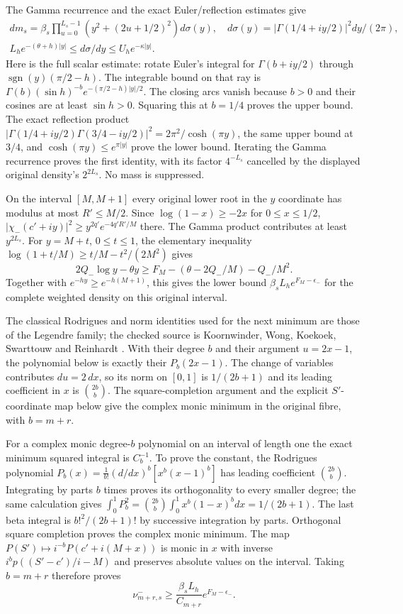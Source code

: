 \documentclass[11pt,a4paper]{article}
\begin{document}
The Gamma recurrence and the exact Euler/reflection estimates give
\[
\begin{gathered}
 dm_s=\beta_s\prod_{u=0}^{L_s-1}(y^2+(2u+1/2)^2)d\sigma(y),\quad
 d\sigma(y)=|\Gamma(1/4+iy/2)|^2dy/(2\pi),\\
 L_he^{-(\theta+h)|y|}\le d\sigma/dy\le U_he^{-\kappa|y|}.
\end{gathered}                                                     \tag{NIB11}
\]
Here is the full scalar estimate: rotate Euler's integral for
$\Gamma(b+iy/2)$ through $\operatorname{sgn}(y)(\pi/2-h)$.
The integrable bound on that ray is
$\Gamma(b)(\sin h)^{-b}e^{-(\pi/2-h)|y|/2}$.
The closing arcs vanish because $b>0$ and their cosines are at
least $\sin h>0$. Squaring this at $b=1/4$ proves the upper
bound. The exact reflection product
$|\Gamma(1/4+iy/2)\Gamma(3/4-iy/2)|^2=2\pi^2/\cosh(\pi y)$,
the same upper bound at $3/4$, and $\cosh(\pi y)\le e^{\pi|y|}$
prove the lower bound. Iterating the Gamma recurrence proves the
first identity, with its factor $4^{-L_s}$ cancelled by the
displayed original density's $2^{2L_s}$. No mass is suppressed.

On the interval $[M,M+1]$ every original lower root in the
$y$ coordinate has modulus at most $R'\le M/2$. Since
$\log(1-x)\ge-2x$ for $0\le x\le1/2$,
$|\chi_-(c'+iy)|^2\ge y^{2q'}e^{-4q'R'/M}$ there.
The Gamma product contributes at least $y^{2L_s}$.
For $y=M+t$, $0\le t\le1$, the elementary inequality
$\log(1+t/M)\ge t/M-t^2/(2M^2)$ gives
\[
 2Q_-\log y-\theta y
 \ge F_M-(\theta-2Q_-/M)-Q_-/M^2.
\]
Together with $e^{-hy}\ge e^{-h(M+1)}$, this gives the lower
bound $\beta_sL_he^{F_M-\epsilon_-}$ for the complete weighted
density on this original interval.

The classical Rodrigues and norm identities used for the next
minimum are those of the Legendre family; the checked source is
Koornwinder, Wong, Koekoek, Swarttouw and Reinhardt
\cite[eq.~(18.5.5), Table~18.5.1, and the Legendre and shifted-Legendre
rows of Table~18.3.1]{human:dlmf18}.
With their degree $b$ and their argument $u=2x-1$, the polynomial
below is exactly their $P_b(2x-1)$. The change of variables contributes
$du=2\,dx$, so its norm on $[0,1]$ is $1/(2b+1)$ and its leading
coefficient in $x$ is $\binom{2b}{b}$. The square-completion argument
and the explicit $S'$-coordinate map below give the complex monic
minimum in the original fibre, with $b=m+r$.

For a complex monic degree-$b$ polynomial on an interval of
length one the exact minimum squared integral is $C_b^{-1}$.
To prove the constant, the Rodrigues polynomial
$P_b(x)=\frac1{b!}(d/dx)^b[x^b(x-1)^b]$ has leading coefficient
$\binom{2b}{b}$. Integrating by parts $b$ times proves its
orthogonality to every smaller degree; the same calculation gives
$\int_0^1P_b^2=\binom{2b}{b}\int_0^1x^b(1-x)^bdx=1/(2b+1)$.
The last beta integral is $b!^2/(2b+1)!$ by successive integration
by parts. Orthogonal square completion proves the complex monic
minimum. The map $P(S')\mapsto i^{-b}P(c'+i(M+x))$ is monic
in $x$ with inverse $i^bp((S'-c')/i-M)$ and preserves absolute
values on the interval. Taking $b=m+r$ therefore proves
\[
 \nu_{m+r,s}^-\ge
           \frac{\beta_sL_h}{C_{m+r}}e^{F_M-\epsilon_-}.   \tag{NIB12}
\]
\end{document}
